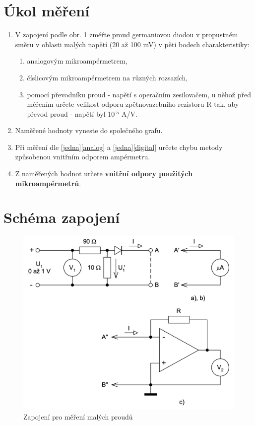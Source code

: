 \documentclass[a4paper,12pt]{article}   %
\newcommand{\texp}[1]{$^\textrm{#1}$}
\begin{document}
\section{Úkol měření}
\label{zadani}
\begin{enumerate}
    \item V zapojení podle obr. 1 změřte proud germaniovou diodou v propustném směru v oblasti malých napětí (20 až 100 mV) v pěti bodech charakteristiky:\label{jedna}
    \begin{enumerate}[label=\alph*)]
        \item analogovým mikroampérmetrem,\label{analog}
        \item číslicovým mikroampérmetrem na různých rozsazích,\label{digital}
        \item pomocí převodníku proud - napětí s operačním zesilovačem, u něhož před měřením určete velikost odporu zpětnovazebního rezistoru R tak, aby převod proud - napětí byl 10\texp{-5} A/V.
    \end{enumerate}
    \item Naměřené hodnoty vyneste do společného grafu.
    \item Při měření dle \ref{jedna}\ref{analog} a \ref{jedna}\ref{digital} určete chybu metody způsobenou vnitřním odporem ampérmetru.
    \item Z naměřených hodnot určete \textbf{vnitřní odpory použitých mikroampérmetrů}.
\end{enumerate}

\section{Schéma zapojení}
\label{schema_zapojeni}
\begin{figure}[h!]
    \centering
    \includegraphics[width=.8\textwidth]{schema.png}
    \caption{Zapojení pro měření malých proudů \cite{navod}}
    \label{fig:schema}
\end{figure}
\end{document}
